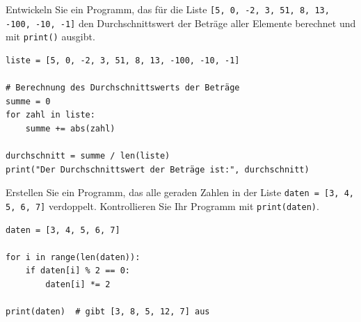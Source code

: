 \begin{myexercise}
    Entwickeln Sie ein Programm, das für die Liste \lstinline|[5, 0, -2, 3, 51, 8, 13, -100, -10, -1]| den Durchschnittswert der Beträge aller Elemente berechnet und mit \lstinline|print()| ausgibt.

    \begin{myanswer}
        \begin{lstlisting}
liste = [5, 0, -2, 3, 51, 8, 13, -100, -10, -1]

# Berechnung des Durchschnittswerts der Beträge
summe = 0
for zahl in liste:
    summe += abs(zahl)

durchschnitt = summe / len(liste)
print("Der Durchschnittswert der Beträge ist:", durchschnitt)
\end{lstlisting}
    \end{myanswer}
\end{myexercise}

\begin{myexercise}
    Erstellen Sie ein Programm, das alle geraden Zahlen in der Liste \lstinline|daten = [3, 4, 5, 6, 7]| verdoppelt. Kontrollieren Sie Ihr Programm mit \lstinline|print(daten)|.

    \begin{myanswer}
        \begin{lstlisting}
daten = [3, 4, 5, 6, 7]

for i in range(len(daten)):
    if daten[i] % 2 == 0:
        daten[i] *= 2

print(daten)  # gibt [3, 8, 5, 12, 7] aus
\end{lstlisting}
    \end{myanswer}
\end{myexercise}

